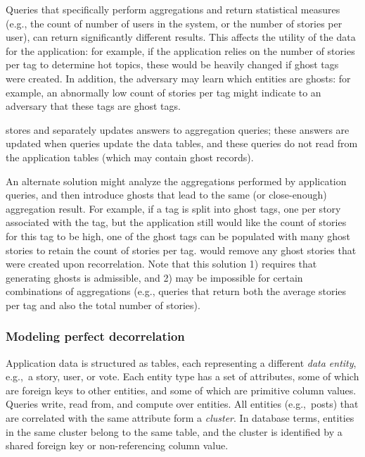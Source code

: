 Queries that specifically perform aggregations and return statistical measures (e.g.,
the count of number of users in the system, or the number of stories per user), can return
significantly different results. This affects the utility of the data for the application: for
example, if the application relies on the number of stories per tag to determine hot topics, these
would be heavily changed if ghost tags were created.  In addition, the adversary may learn which
entities are ghosts: for example, an abnormally low count of stories per tag might indicate to an
adversary that these tags are ghost tags.  

\sys{} stores and separately updates answers to aggregation queries;
these answers are updated when queries update the data tables, and these queries do not read from
the application tables (which may contain ghost records).

An alternate solution might analyze the aggregations performed by application queries, and then
introduce ghosts that lead to the same (or close-enough) aggregation result. For example, if a tag
is split into ghost tags, one per story associated with the tag, but the application still would
like the count of stories for this tag to be high, one of the ghost tags can be populated with many
ghost stories to retain the count of stories per tag.  \sys{} would remove any ghost stories that
were created upon recorrelation. Note that this solution 1) requires that generating ghosts is
admissible, and 2) may be impossible for certain combinations of aggregations (e.g., queries that
return both the average stories per tag and also the total number of stories).


\iffalse
\subsubsection{Modeling perfect decorrelation}
Application data is structured as tables, each representing a different \emph{data entity}, e.g.,\ a
story, user, or vote. Each entity type has a set of attributes, some of which are foreign keys to
other entities, and some of which are primitive column values.
Queries write, read from, and compute over entities.  All entities (e.g.,\
posts) that are correlated with the same attribute form a \emph{cluster}.
In database terms, entities in the same cluster belong to the same table, and the cluster is
identified by a shared foreign key or non-referencing column value.

